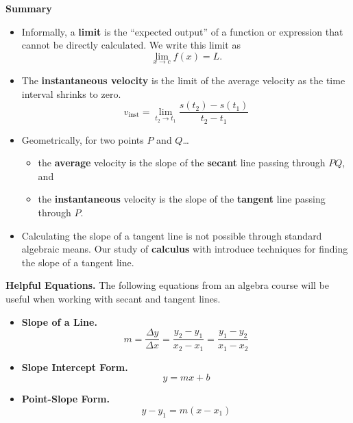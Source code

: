\documentclass[12pt]{article}
\begin{document}
        
\newpage

\textbf{Summary}
\begin{itemize}
	\item Informally, a \textbf{limit} is the ``expected output'' of a function or expression that cannot be directly calculated. We write this limit as 
	$$\lim_{x\to c} f(x)=L.$$
	
	\item The \textbf{instantaneous velocity} is the limit of the average velocity as the time interval shrinks to zero.
	$$v_{\text{inst}}=\lim_{t_2\to t_1}\frac{s(t_2)-s(t_1)}{t_2-t_1}$$
	
	\item Geometrically, for two points $P$ and $Q$\dots
	\begin{itemize}
		\item the \textbf{average} velocity is the slope of the \textbf{secant} line passing through $PQ$, and
		\item the \textbf{instantaneous} velocity is the slope of the \textbf{tangent} line passing through $P$.
	\end{itemize}
	\item Calculating the slope of a tangent line is not possible through standard algebraic means. Our study of \textbf{calculus} with introduce techniques for finding the slope of a tangent line.

\end{itemize}

\vspace{5mm}

\textbf{Helpful Equations.} The following equations from an algebra course will be useful when working with secant and tangent lines.
\begin{itemize}
\item \textbf{Slope of a Line.}
$$m=\frac{\Delta y}{\Delta x}=\frac{y_2-y_1}{x_2-x_1}=\frac{y_1-y_2}{x_1-x_2}$$
\item \textbf{Slope Intercept Form.}
$$y=mx+b$$
\item \textbf{Point-Slope Form.}
$$y-y_1=m(x-x_1)$$
\end{itemize}
\end{document}
